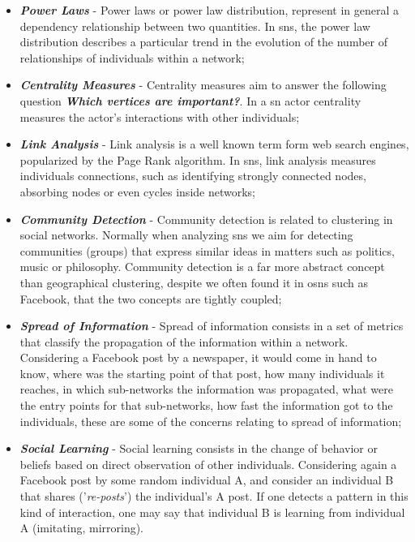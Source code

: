 \begin{itemize}
\item \textbf{\textit{Power Laws}} - Power laws or power law distribution, represent in general a dependency relationship between two quantities. In \glspl{sn}, the power law distribution describes a particular trend in the evolution of the number of relationships of individuals within a network;
\item \textbf{\textit{Centrality Measures}} - Centrality measures aim to answer the following question \textit{\textbf{Which vertices are important?}}. In a \gls{sn} actor centrality measures the actor's interactions with other individuals;
\item \textbf{\textit{Link Analysis}} - Link analysis is a well known term form web search engines, popularized by the Page Rank algorithm. In \glspl{sn}, link analysis measures individuals connections, such as identifying strongly connected nodes, absorbing nodes or even cycles inside networks;
\item \textbf{\textit{Community Detection}} - Community detection is related to clustering in social networks. Normally when analyzing \glspl{sn} we aim for detecting communities (groups) that express similar ideas in matters such as politics, music or philosophy. Community detection is a far more abstract concept than geographical clustering, despite we often found it in \glspl{osn} such as Facebook, that the two concepts are tightly coupled;
\item \textbf{\textit{Spread of Information}} - Spread of information consists in a set of metrics that classify the propagation of the information within a network. Considering a Facebook post by a newspaper, it would come in hand to know, where was the starting point of that post, how many individuals it reaches, in which sub-networks the information was propagated, what were the entry points for that sub-networks, how fast the information got to the individuals, these are some of the concerns relating to spread of information;
\item \textbf{\textit{Social Learning}} - Social learning consists in the change of behavior or beliefs based on direct observation of other individuals. Considering again a Facebook post by some random individual A, and consider an individual B that shares ('\textit{re-posts}') the individual's A post. If one detects a pattern in this kind of interaction, one may say that individual B is learning from individual A (imitating, mirroring).
\end{itemize}

